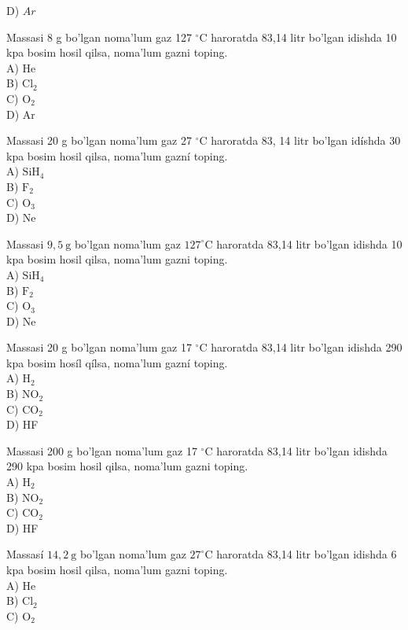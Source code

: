 D) $Ar$
  \setcounter{enumi}{61}
  \item Massasi 8 g bo'lgan noma'lum gaz 127 ${ }^{\circ} \mathrm{C}$ haroratda 83,14 litr bo'lgan idishda 10 kpa bosim hosil qilsa, noma'lum gazni toping.\\
A) He\\
B) $\mathrm{Cl}_{2}$\\
C) $\mathrm{O}_{2}$\\
D) Ar
  \item Massasi 20 g bo'lgan noma'lum gaz 27 ${ }^{\circ} \mathrm{C}$ haroratda 83, 14 litr bo'lgan idíshda 30 kpa bosim hosil qilsa, noma'lum gazní toping.\\
A) $\mathrm{SiH}_{4}$\\
B) $\mathrm{F}_{2}$\\
C) $\mathrm{O}_{3}$\\
D) Ne
  \item Massasi $9,5 \mathrm{~g}$ bo'lgan noma'lum gaz $127^{\circ} \mathrm{C}$ haroratda 83,14 litr bo'lgan idishda 10 kpa bosim hosil qilsa, noma'lum gazni toping.\\
A) $\mathrm{SiH}_{4}$\\
B) $\mathrm{F}_{2}$\\
C) $\mathrm{O}_{3}$\\
D) Ne
  \item Massasi 20 g bo'lgan noma'lum gaz 17 ${ }^{\circ} \mathrm{C}$ haroratda 83,14 litr bo'lgan idishda 290 kpa bosim hosíl qílsa, noma'lum gazní toping.\\
A) $\mathrm{H}_{2}$\\
B) $\mathrm{NO}_{2}$\\
C) $\mathrm{CO}_{2}$\\
D) HF
  \item Massasi 200 g bo'lgan noma'lum gaz 17 ${ }^{\circ} \mathrm{C}$ haroratda 83,14 litr bo'lgan idishda 290 kpa bosim hosil qilsa, noma'lum gazni toping.\\
A) $\mathrm{H}_{2}$\\
B) $\mathrm{NO}_{2}$\\
C) $\mathrm{CO}_{2}$\\
D) HF
  \item Massasí $14,2 \mathrm{~g}$ bo'lgan noma'lum gaz $27^{\circ} \mathrm{C}$ haroratda 83,14 litr bo'lgan idishda 6 kpa bosim hosil qilsa, noma'lum gazni toping.\\
A) He\\
B) $\mathrm{Cl}_{2}$\\
C) $\mathrm{O}_{2}$\\
